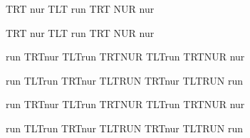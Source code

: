 
\nopagenumbers
\parindent=0mm
\textdir TRT nur {\textdir TLT run \textdir TRT NUR} nur

\textdir TRT nur {{\textdir TLT run} {\textdir TRT NUR}} nur


\def\ltr{\textdir TLT\relax}
\def\rtl{\textdir TRT\relax}

run {\rtl nur {\ltr run \rtl NUR \ltr run \rtl NUR} nur}

run {\ltr run {\rtl nur \ltr RUN \rtl nur \ltr RUN} run}


\def\ltr{\linedir TLT\relax}
\def\rtl{\linedir TRT\relax}

run {\rtl nur {\ltr run \rtl NUR \ltr run \rtl NUR} nur}

run {\ltr run {\rtl nur \ltr RUN \rtl nur \ltr RUN} run}
\bye
